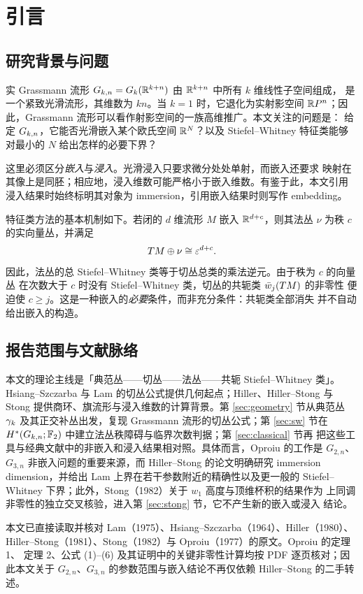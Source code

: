 \section{引言}

\subsection{研究背景与问题}

实 Grassmann 流形 $G_{k,n}=G_k(\mathbb{R}^{k+n})$ 由 $\mathbb{R}^{k+n}$ 中所有 $k$ 维线性子空间组成，
是一个紧致光滑流形，其维数为 $kn$。当 $k=1$ 时，它退化为实射影空间
$\mathbb{R} P^n$；因此，Grassmann 流形可以看作射影空间的一族高维推广。本文关注的问题是：
给定 $G_{k,n}$，它能否光滑嵌入某个欧氏空间 $\mathbb{R}^N$？以及 Stiefel--Whitney 特征类能够
对最小的 $N$ 给出怎样的必要下界？

这里必须区分\emph{嵌入}与\emph{浸入}。光滑浸入只要求微分处处单射，而嵌入还要求
映射在其像上是同胚；相应地，浸入维数可能严格小于嵌入维数。有鉴于此，本文引用
浸入结果时始终标明其对象为 immersion，引用嵌入结果时则写作 embedding。

特征类方法的基本机制如下。若闭的 $d$ 维流形 $M$ 嵌入 $\mathbb{R}^{d+c}$，则其法丛 $\nu$
为秩 $c$ 的实向量丛，并满足
\begin{equation}
  TM\oplus\nu\cong\varepsilon^{d+c}.
  \label{eq:stable-trivial}
\end{equation}
因此，法丛的总 Stiefel--Whitney 类等于切丛总类的乘法逆元。由于秩为 $c$ 的向量丛
在次数大于 $c$ 时没有 Stiefel--Whitney 类，切丛的共轭类 $\bar w_j(TM)$ 的非零性
便迫使 $c\ge j$。这是一种嵌入的\emph{必要}条件，而非充分条件：共轭类全部消失
并不自动给出嵌入的构造。

\subsection{报告范围与文献脉络}

本文的理论主线是「典范丛——切丛——法丛——共轭 Stiefel--Whitney 类」。
Hsiang--Szczarba 与 Lam 的切丛公式提供几何起点；Hiller、Hiller--Stong 与 Stong
提供商环、旗流形与浸入维数的计算背景。第 \ref{sec:geometry} 节从典范丛
$\gamma_k$ 及其正交补丛出发，复现 Grassmann 流形的切丛公式；第 \ref{sec:sw} 节在
$H^{*}(G_{k,n};\mathbb{F}_2)$ 中建立法丛秩障碍与临界次数判据；第 \ref{sec:classical} 节再
把这些工具与经典文献中的非嵌入和浸入结果相对照。具体而言，Oproiu 的工作是
$G_{2,n}$、$G_{3,n}$ 非嵌入问题的重要来源，而 Hiller--Stong 的论文明确研究
immersion dimension，并给出 Lam 上界在若干参数附近的精确性以及更一般的
Stiefel--Whitney 下界；此外，Stong（1982）关于 $w_1$ 高度与顶维杯积的结果作为
上同调非零性的独立交叉核验，进入第 \ref{sec:stong} 节，它不产生新的嵌入或浸入
结论。

本文已直接读取并核对 Lam（1975）、Hsiang--Szczarba（1964）、Hiller（1980）、
Hiller--Stong（1981）、Stong（1982）与 Oproiu（1977）的原文。Oproiu 的定理 1、
定理 2、公式 (1)--(6) 及其证明中的关键非零性计算均按 PDF 逐页核对；因此本文关于
$G_{2,n}$、$G_{3,n}$ 的参数范围与嵌入结论不再仅依赖 Hiller--Stong 的二手转述。
